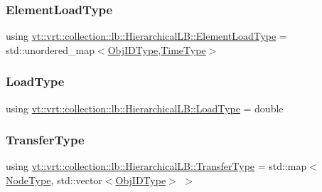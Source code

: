 \subsubsection{\texorpdfstring{Element\+Load\+Type}{ElementLoadType}}
{\footnotesize\ttfamily using \hyperlink{structvt_1_1vrt_1_1collection_1_1lb_1_1_hierarchical_l_b_ae63d1ddb968e51d0c57b546bdc1d08c7}{vt\+::vrt\+::collection\+::lb\+::\+Hierarchical\+L\+B\+::\+Element\+Load\+Type} =  std\+::unordered\+\_\+map$<$\hyperlink{structvt_1_1vrt_1_1collection_1_1lb_1_1_base_l_b_a15a2f756b59c8c2437985206b32aa403}{Obj\+I\+D\+Type},\hyperlink{namespacevt_a876a9d0cd5a952859c72de8a46881442}{Time\+Type}$>$}

\mbox{\label{structvt_1_1vrt_1_1collection_1_1lb_1_1_hierarchical_l_b_aac9e2507c1e3c0a3321567ff02aebe6f}} 
\subsubsection{\texorpdfstring{Load\+Type}{LoadType}}
{\footnotesize\ttfamily using \hyperlink{structvt_1_1vrt_1_1collection_1_1lb_1_1_hierarchical_l_b_aac9e2507c1e3c0a3321567ff02aebe6f}{vt\+::vrt\+::collection\+::lb\+::\+Hierarchical\+L\+B\+::\+Load\+Type} =  double}

\mbox{\label{structvt_1_1vrt_1_1collection_1_1lb_1_1_hierarchical_l_b_a83550b541c35c8a1cc0c97779d1c8184}} 
\subsubsection{\texorpdfstring{Transfer\+Type}{TransferType}}
{\footnotesize\ttfamily using \hyperlink{structvt_1_1vrt_1_1collection_1_1lb_1_1_hierarchical_l_b_a83550b541c35c8a1cc0c97779d1c8184}{vt\+::vrt\+::collection\+::lb\+::\+Hierarchical\+L\+B\+::\+Transfer\+Type} =  std\+::map$<$\hyperlink{namespacevt_a866da9d0efc19c0a1ce79e9e492f47e2}{Node\+Type}, std\+::vector$<$\hyperlink{structvt_1_1vrt_1_1collection_1_1lb_1_1_base_l_b_a15a2f756b59c8c2437985206b32aa403}{Obj\+I\+D\+Type}$>$ $>$}




